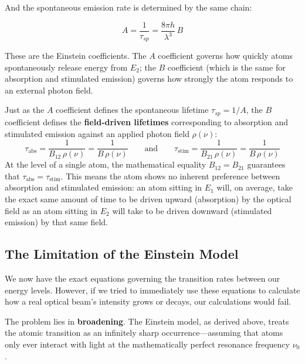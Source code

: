 And the spontaneous emission rate is determined by the same chain:
\begin{keyresult}
    \begin{equation}
        A = \frac{1}{\tau_{sp}} = \frac{8\pi h}{\lambda^3}\,B
    \end{equation}
\end{keyresult}

These are the Einstein coefficients. The $A$ coefficient governs how quickly atoms spontaneously release energy from $E_2$; the $B$ coefficient (which is the same for absorption and stimulated emission) governs how strongly the atom responds to an external photon field.

\begin{keyinsight}
    Just as the $A$ coefficient defines the spontaneous lifetime $\tau_{sp} = 1/A$, the $B$ coefficient defines the \textbf{field-driven lifetimes} corresponding to absorption and stimulated emission against an applied photon field $\rho(\nu)$:
    \begin{equation*}
        \tau_{\text{abs}} = \frac{1}{B_{12}\,\rho(\nu)} = \frac{1}{B\,\rho(\nu)}
        \qquad \text{and} \qquad
        \tau_{\text{stim}} = \frac{1}{B_{21}\,\rho(\nu)} = \frac{1}{B\,\rho(\nu)}
    \end{equation*}
    At the level of a single atom, the mathematical equality $B_{12} = B_{21}$ guarantees that $\tau_{\text{abs}} = \tau_{\text{stim}}$. This means the atom shows no inherent preference between absorption and stimulated emission: an atom sitting in $E_1$ will, on average, take the exact same amount of time to be driven upward (absorption) by the optical field as an atom sitting in $E_2$ will take to be driven downward (stimulated emission) by that same field.
\end{keyinsight}

\subsection{The Limitation of the Einstein Model}

We now have the exact equations governing the transition rates between our energy levels. However, if we tried to immediately use these equations to calculate how a real optical beam's intensity grows or decays, our calculations would fail.

The problem lies in \textbf{broadening}. The Einstein model, as derived above, treats the atomic transition as an infinitely sharp occurrence—assuming that atoms only ever interact with light at the mathematically perfect resonance frequency $\nu_0$.

